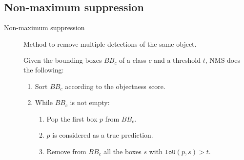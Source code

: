 \subsection{Non-maximum suppression}

\begin{description}
    \item[Non-maximum suppression] 
        Method to remove multiple detections of the same object.

        Given the bounding boxes $BB_c$ of a class $c$ and a threshold $t$, NMS does the following:
        \begin{enumerate}
            \item Sort $BB_c$ according to the objectness score.
            \item While $BB_c$ is not empty:
            \begin{enumerate}
                \item Pop the first box $p$ from $BB_c$.
                \item $p$ is considered as a true prediction.
                \item Remove from $BB_c$ all the boxes $s$ with $\texttt{IoU}(p, s) > t$.
            \end{enumerate}
        \end{enumerate}
\end{description}